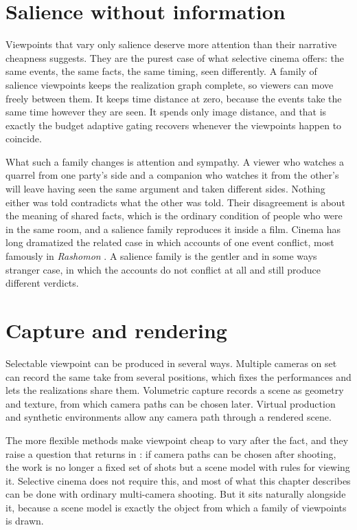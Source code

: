 \section{Salience without information}

Viewpoints that vary only salience deserve more attention than their narrative cheapness suggests. They are the purest case of what selective cinema offers: the same events, the same facts, the same timing, seen differently. A family of salience viewpoints keeps the realization graph complete, so viewers can move freely between them. It keeps time distance at zero, because the events take the same time however they are seen. It spends only image distance, and that is exactly the budget adaptive gating recovers whenever the viewpoints happen to coincide.

What such a family changes is attention and sympathy. A viewer who watches a quarrel from one party's side and a companion who watches it from the other's will leave having seen the same argument and taken different sides. Nothing either was told contradicts what the other was told. Their disagreement is about the meaning of shared facts, which is the ordinary condition of people who were in the same room, and a salience family reproduces it inside a film. Cinema has long dramatized the related case in which accounts of one event conflict, most famously in \emph{Rashomon} \cite{rashomon}. A salience family is the gentler and in some ways stranger case, in which the accounts do not conflict at all and still produce different verdicts.

\section{Capture and rendering}

Selectable viewpoint can be produced in several ways. Multiple cameras on set can record the same take from several positions, which fixes the performances and lets the realizations share them. Volumetric capture records a scene as geometry and texture, from which camera paths can be chosen later. Virtual production and synthetic environments allow any camera path through a rendered scene.

The more flexible methods make viewpoint cheap to vary after the fact, and they raise a question that returns in : if camera paths can be chosen after shooting, the work is no longer a fixed set of shots but a scene model with rules for viewing it. Selective cinema does not require this, and most of what this chapter describes can be done with ordinary multi-camera shooting. But it sits naturally alongside it, because a scene model is exactly the object from which a family of viewpoints is drawn.

